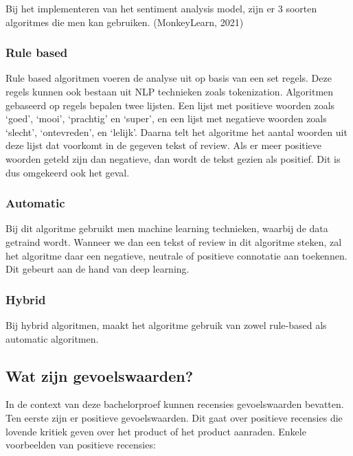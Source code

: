 Bij het implementeren van het sentiment analysis model, zijn er 3 soorten algoritmes die men kan gebruiken. (MonkeyLearn, 2021)

\subsubsection{Rule based}
\label{rule based}

Rule based algoritmen voeren de analyse uit op basis van een set regels. Deze regels kunnen ook bestaan uit NLP technieken zoals tokenization. Algoritmen gebaseerd op regels bepalen twee lijsten. Een lijst met positieve woorden zoals ‘goed’, ‘mooi’, ‘prachtig’ en ‘super’, en een lijst met negatieve woorden zoals ‘slecht’, ‘ontevreden’,  en  ‘lelijk’. Daarna telt het algoritme het aantal woorden uit deze lijst dat voorkomt in de gegeven tekst of review. Als er meer positieve woorden geteld zijn dan negatieve, dan wordt de tekst gezien als positief. Dit is dus omgekeerd ook het geval. \autocite{MonkeyLearn2021}

\subsubsection{Automatic}
\label{automatic}

Bij dit algoritme gebruikt men machine learning technieken, waarbij de data getraind wordt. Wanneer we dan een tekst of review in dit algoritme steken, zal het algoritme daar een negatieve, neutrale of positieve connotatie aan toekennen. Dit gebeurt aan de hand van deep learning. \autocite{MonkeyLearn2021}

\subsubsection{Hybrid}
\label{hybrid}

Bij hybrid algoritmen, maakt het algoritme gebruik van zowel rule-based als automatic algoritmen. \autocite{MonkeyLearn2021}

\subsection{Wat zijn gevoelswaarden?}
\label{gevoelswaarden}

In de context van deze bachelorproef kunnen recensies gevoelswaarden bevatten. Ten eerste zijn er positieve gevoelswaarden. Dit gaat over positieve recensies die lovende kritiek geven over het product of het product aanraden. Enkele voorbeelden van positieve recensies: 


